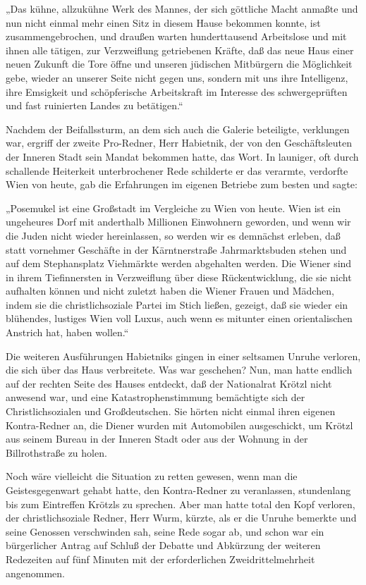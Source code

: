 „Das kühne, allzukühne Werk des Mannes, der sich göttliche Macht
anmaßte und nun nicht einmal mehr einen Sitz in diesem Hause
bekommen konnte, ist zusammengebrochen, und draußen warten
hunderttausend Arbeitslose und mit ihnen alle tätigen, zur
Verzweiflung getriebenen Kräfte, daß das neue Haus einer neuen
Zukunft die Tore öffne und unseren jüdischen Mitbürgern die
Möglichkeit gebe, wieder an unserer Seite nicht gegen uns, sondern
mit uns ihre Intelligenz, ihre Emsigkeit und schöpferische
Arbeitskraft im Interesse des schwergeprüften und fast ruinierten
Landes zu betätigen.“

Nachdem der Beifallssturm, an dem sich auch die Galerie beteiligte,
verklungen war, ergriff der zweite Pro-Redner, Herr Habietnik, der
von den Geschäftsleuten der Inneren Stadt sein Mandat bekommen
hatte, das Wort. In launiger, oft durch schallende Heiterkeit
unterbrochener Rede schilderte  er das verarmte,
verdorfte Wien von heute, gab die Erfahrungen im eigenen Betriebe
zum besten und sagte:

„Posemukel ist eine Großstadt im Vergleiche zu Wien von heute. Wien
ist ein ungeheures Dorf mit anderthalb Millionen Einwohnern
geworden, und wenn wir die Juden nicht wieder hereinlassen, so
werden wir es demnächst erleben, daß statt vornehmer Geschäfte in
der Kärntnerstraße Jahrmarktsbuden stehen und auf dem Stephansplatz
Viehmärkte werden abgehalten werden. Die Wiener sind in ihrem
Tiefinnersten in Verzweiflung über diese Rückentwicklung, die sie
nicht aufhalten können und nicht zuletzt haben die Wiener Frauen
und Mädchen, indem sie die christlichsoziale Partei im Stich
ließen, gezeigt, daß sie wieder ein blühendes, lustiges Wien voll
Luxus, auch wenn es mitunter einen orientalischen Anstrich hat,
haben wollen.“

Die weiteren Ausführungen Habietniks gingen in einer seltsamen
Unruhe verloren, die sich über das Haus verbreitete. Was war
geschehen? Nun, man hatte endlich auf der rechten Seite des Hauses
entdeckt, daß der Nationalrat Krötzl nicht anwesend war, und eine
Katastrophenstimmung bemächtigte sich der Christlichsozialen und
Großdeutschen. Sie hörten nicht einmal ihren eigenen Kontra-Redner
an, die Diener wurden mit Automobilen ausgeschickt, um Krötzl aus
seinem Bureau in der Inneren Stadt oder aus der Wohnung in der
Billrothstraße zu holen.

Noch wäre vielleicht die Situation zu retten gewesen, wenn man die
Geistesgegenwart gehabt hatte, den Kontra-Redner zu veranlassen,
stundenlang bis zum Eintreffen Krötzls zu sprechen. Aber man hatte
total den Kopf verloren,  der christlichsoziale
Redner, Herr Wurm, kürzte, als er die Unruhe bemerkte und seine
Genossen verschwinden sah, seine Rede sogar ab, und schon war ein
bürgerlicher Antrag auf Schluß der Debatte und Abkürzung der
weiteren Redezeiten auf fünf Minuten mit der erforderlichen
Zweidrittelmehrheit angenommen.

